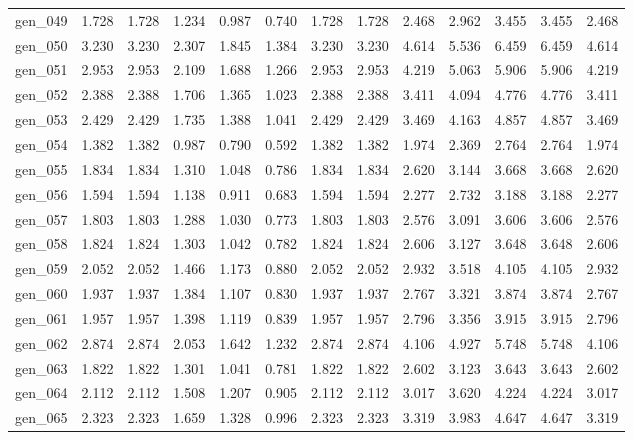 \begin{tabular}{lrrrrrrrrrrrr}
gen\_049 &  1.728 &  1.728 &  1.234 &  0.987 &  0.740 &  1.728 &  1.728 &  2.468 &  2.962 &  3.455 &  3.455 &  2.468 \\
gen\_050 &  3.230 &  3.230 &  2.307 &  1.845 &  1.384 &  3.230 &  3.230 &  4.614 &  5.536 &  6.459 &  6.459 &  4.614 \\
gen\_051 &  2.953 &  2.953 &  2.109 &  1.688 &  1.266 &  2.953 &  2.953 &  4.219 &  5.063 &  5.906 &  5.906 &  4.219 \\
gen\_052 &  2.388 &  2.388 &  1.706 &  1.365 &  1.023 &  2.388 &  2.388 &  3.411 &  4.094 &  4.776 &  4.776 &  3.411 \\
gen\_053 &  2.429 &  2.429 &  1.735 &  1.388 &  1.041 &  2.429 &  2.429 &  3.469 &  4.163 &  4.857 &  4.857 &  3.469 \\
gen\_054 &  1.382 &  1.382 &  0.987 &  0.790 &  0.592 &  1.382 &  1.382 &  1.974 &  2.369 &  2.764 &  2.764 &  1.974 \\
gen\_055 &  1.834 &  1.834 &  1.310 &  1.048 &  0.786 &  1.834 &  1.834 &  2.620 &  3.144 &  3.668 &  3.668 &  2.620 \\
gen\_056 &  1.594 &  1.594 &  1.138 &  0.911 &  0.683 &  1.594 &  1.594 &  2.277 &  2.732 &  3.188 &  3.188 &  2.277 \\
gen\_057 &  1.803 &  1.803 &  1.288 &  1.030 &  0.773 &  1.803 &  1.803 &  2.576 &  3.091 &  3.606 &  3.606 &  2.576 \\
gen\_058 &  1.824 &  1.824 &  1.303 &  1.042 &  0.782 &  1.824 &  1.824 &  2.606 &  3.127 &  3.648 &  3.648 &  2.606 \\
gen\_059 &  2.052 &  2.052 &  1.466 &  1.173 &  0.880 &  2.052 &  2.052 &  2.932 &  3.518 &  4.105 &  4.105 &  2.932 \\
gen\_060 &  1.937 &  1.937 &  1.384 &  1.107 &  0.830 &  1.937 &  1.937 &  2.767 &  3.321 &  3.874 &  3.874 &  2.767 \\
gen\_061 &  1.957 &  1.957 &  1.398 &  1.119 &  0.839 &  1.957 &  1.957 &  2.796 &  3.356 &  3.915 &  3.915 &  2.796 \\
gen\_062 &  2.874 &  2.874 &  2.053 &  1.642 &  1.232 &  2.874 &  2.874 &  4.106 &  4.927 &  5.748 &  5.748 &  4.106 \\
gen\_063 &  1.822 &  1.822 &  1.301 &  1.041 &  0.781 &  1.822 &  1.822 &  2.602 &  3.123 &  3.643 &  3.643 &  2.602 \\
gen\_064 &  2.112 &  2.112 &  1.508 &  1.207 &  0.905 &  2.112 &  2.112 &  3.017 &  3.620 &  4.224 &  4.224 &  3.017 \\
gen\_065 &  2.323 &  2.323 &  1.659 &  1.328 &  0.996 &  2.323 &  2.323 &  3.319 &  3.983 &  4.647 &  4.647 &  3.319 \\

\end{tabular}
